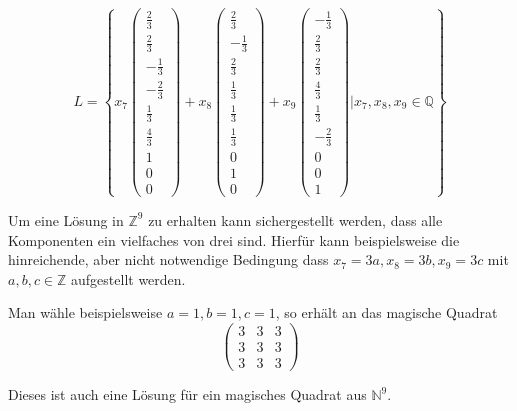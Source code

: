 \[
L = \left\{
  x_7\begin{pmatrix}
    \frac{2}{3}\\
    \frac{2}{3} \\ 
    - \frac{1}{3} \\
    - \frac{2}{3} \\
    \frac{1}{3} \\
    \frac{4}{3} \\
    1 \\
    0 \\
    0
  \end{pmatrix} + x_8\begin{pmatrix}
    \frac{2}{3} \\
    -\frac{1}{3} \\ 
    \frac{2}{3} \\
    \frac{1}{3} \\
    \frac{1}{3} \\
    \frac{1}{3} \\
    0 \\
    1 \\
    0
  \end{pmatrix} + x_9\begin{pmatrix}
    - \frac{1}{3} \\
    \frac{2}{3} \\ 
    \frac{2}{3} \\
    \frac{4}{3} \\
    \frac{1}{3} \\
    - \frac{2}{3} \\
    0 \\
    0 \\
    1
  \end{pmatrix} \Bigg| x_7, x_8, x_9 \in \mathbb{Q} 
  \right\}
\]

Um eine Lösung in $\mathbb{Z}^9$ zu erhalten kann sichergestellt werden, dass alle Komponenten
ein vielfaches von drei sind. Hierfür kann beispielsweise die hinreichende, aber nicht notwendige Bedingung dass $x_7 = 3a, x_8 = 3b, x_9 = 3c$ mit $a, b, c \in \mathbb{Z}$ aufgestellt werden.

Man wähle beispielsweise $a = 1, b = 1, c = 1$, so erhält an das magische Quadrat 
\[
\begin{pmatrix}
  3 & 3 & 3 \\ 3 & 3 & 3 \\ 3 & 3 & 3
\end{pmatrix}
\]

Dieses ist auch eine Lösung für ein magisches Quadrat aus $\mathbb{N}^9$.

